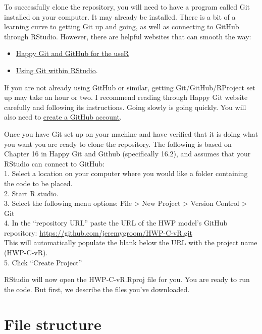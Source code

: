 \documentclass[
  openany]{book}
\providecommand{\tightlist}{%
  \setlength{\itemsep}{0pt}\setlength{\parskip}{0pt}}
\begin{document}
To successfully clone the repository, you will need to have a program called Git installed on your computer. It may already be installed. There is a bit of a learning curve to getting Git up and going, as well as connecting to GitHub through RStudio. However, there are helpful websites that can smooth the way:

\begin{itemize}
\tightlist
\item
  \href{https://happygitwithr.com/index.html}{Happy Git and GitHub for the useR}\\
\item
  \href{https://cfss.uchicago.edu/setup/git-with-rstudio/}{Using Git within RStudio}.
\end{itemize}

If you are not already using GitHub or similar, getting Git/GitHub/RProject set up may take an hour or two. I recommend reading through Happy Git website carefully and following its instructions. Going slowly is going quickly. You will also need to \href{https://github.com/signup?ref_cta=Sign+up\&ref_loc=header+logged+out\&ref_page=\%2F\&source=header-home}{create a GitHub account}.

Once you have Git set up on your machine and have verified that it is doing what you want you are ready to clone the repository. The following is based on Chapter 16 in Happy Git and Github (specifically 16.2), and assumes that your RStudio can connect to GitHub:\\
1. Select a location on your computer where you would like a folder containing the code to be placed.\\
2. Start R studio.\\
3. Select the following menu options: File \textgreater{} New Project \textgreater{} Version Control \textgreater{} Git\\
4. In the ``repository URL'' paste the URL of the HWP model's GitHub repository: \url{https://github.com/jeremygroom/HWP-C-vR.git}\\
This will automatically populate the blank below the URL with the project name (HWP-C-vR).\\
5. Click ``Create Project''

RStudio will now open the HWP-C-vR.Rproj file for you. You are ready to run the code. But first, we describe the files you've downloaded.

\hypertarget{dnld-files}{%
\section{File structure}\label{dnld-files}}
\end{document}
